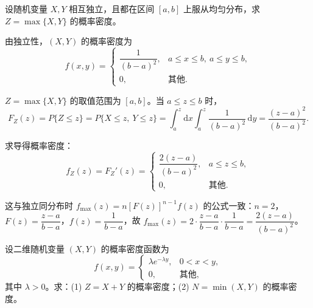 \documentclass[lang=cn,11pt]{elegantbook}
\begin{document}
\begin{exercise}[均匀分布最大值密度] \label{exer:3-10b}
设随机变量 $X, Y$ 相互独立，且都在区间 $[a, b]$ 上服从均匀分布，求 $Z = \max\{X, Y\}$ 的概率密度。
\end{exercise}

\begin{solution}
由独立性，$(X,Y)$ 的概率密度为
\[
f(x,y) = \begin{cases} \dfrac{1}{(b-a)^2}, & a \leqslant x \leqslant b,\ a \leqslant y \leqslant b, \\ 0, & \text{其他}. \end{cases}
\]

$Z = \max\{X, Y\}$ 的取值范围为 $[a, b]$。当 $a \leqslant z \leqslant b$ 时，
\[
F_Z(z) = P\{Z \leqslant z\} = P\{X \leqslant z,\ Y \leqslant z\} = \int_a^z\mathrm{d}x\int_a^z \frac{1}{(b-a)^2}\,\mathrm{d}y = \frac{(z-a)^2}{(b-a)^2}.
\]

求导得概率密度：
\[
f_Z(z) = F_Z'(z) = \begin{cases} \dfrac{2(z-a)}{(b-a)^2}, & a \leqslant z \leqslant b, \\ 0, & \text{其他}. \end{cases}
\]

\begin{note}
这与独立同分布时 $f_{\max}(z) = n[F(z)]^{n-1}f(z)$ 的公式一致：$n=2$，$F(z) = \dfrac{z-a}{b-a}$，$f(z) = \dfrac{1}{b-a}$，故 $f_{\max}(z) = 2 \cdot \dfrac{z-a}{b-a} \cdot \dfrac{1}{b-a} = \dfrac{2(z-a)}{(b-a)^2}$。
\end{note}
\end{solution}



\begin{exercise}[指数分布条件区域] \label{exer:3-12b}
设二维随机变量 $(X,Y)$ 的概率密度函数为
\[
f(x,y) = \begin{cases} \lambda e^{-\lambda y}, & 0 < x < y, \\ 0, & \text{其他}, \end{cases}
\]
其中 $\lambda > 0$。求：(1) $Z = X + Y$ 的概率密度；(2) $N = \min(X,Y)$ 的概率密度。
\end{exercise}
\end{document}
